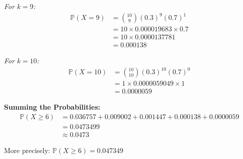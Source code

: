 \documentclass[12pt]{article}
\begin{document}
\begin{solution}
\textit{For \(k = 9\):}
\begin{align*}
\mathbb{P}(X = 9) &= \binom{10}{9} (0.3)^9 (0.7)^1 \\
&= 10 \times 0.000019683 \times 0.7 \\
&= 10 \times 0.0000137781 \\
&= 0.000138
\end{align*}

\textit{For \(k = 10\):}
\begin{align*}
\mathbb{P}(X = 10) &= \binom{10}{10} (0.3)^{10} (0.7)^0 \\
&= 1 \times 0.0000059049 \times 1 \\
&= 0.0000059
\end{align*}

\textbf{Summing the Probabilities:}
\begin{align*}
\mathbb{P}(X \geq 6) &= 0.036757 + 0.009002 + 0.001447 + 0.000138 + 0.0000059 \\
&= 0.0473499 \\
&\approx \boxed{0.0473}
\end{align*}

More precisely: \(\mathbb{P}(X \geq 6) = 0.047349\)
\end{solution}
\end{document}
